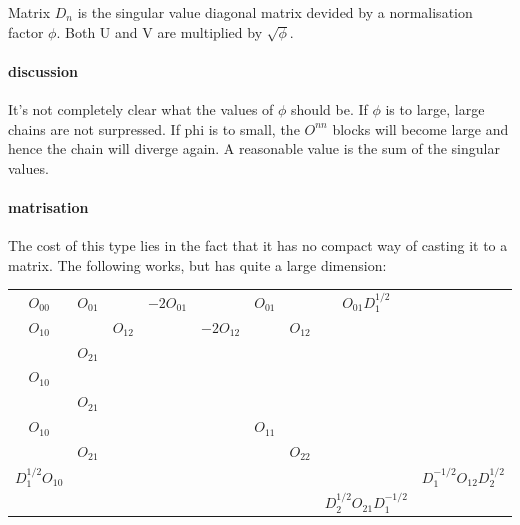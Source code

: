 Matrix $D_n$ is the singular value diagonal matrix devided by a normalisation factor $\phi$. Both U and V are multiplied by $  \sqrt{\phi} $.

\paragraph{discussion}
It's not completely clear what the values of $\phi$ should be.  If $\phi$ is to large, large chains are not surpressed. If phi is to small, the $O^{n n}$ blocks will become large and hence the chain will diverge again. A reasonable value is the sum of the singular values. 

\paragraph{matrisation}
The cost of this type lies in the fact that it has no compact way of casting it to a matrix. The following works, but has quite a large dimension:

\begin{tabular}{ccc|cc|cc|cc}
    $O_{00}$               & $O_{01} $   &             & $-2  O_{01}$ &                & $ O_{01}$ &             & $ O_{01}  D_1^{1/2}$           &                                \\
    ${O_{10}}$             &             & ${ O_{12}}$ &              & $-2 { O_{12}}$ &           & ${ O_{12}}$ &                                &                                \\
                           & ${ O_{21}}$ &             &              &                &           &             &                                &                                \\
    \hline
    ${O_{10}}$             &             &             &              &                &           &             &                                &                                \\
                           & ${ O_{21}}$ &             &              &                &           &             &                                &                                \\
    \hline
    ${ O_{10}}$            &             &             &              &                & $O_{11}$  &             &                                &                                \\
                           & ${ O_{21}}$ &             &              &                &           & $O_{22}$    &                                &                                \\
    \hline
    $ D_1^{1/2} { O_{10}}$ &             &             &              &                &           &             &                                & $D_1^{-1/2} O_{12}  D_2^{1/2}$ \\
                           &             &             &              &                &           &             & $ D_2^{1/2} O_{21} D_1^{-1/2}$                                  \\\end{tabular}

